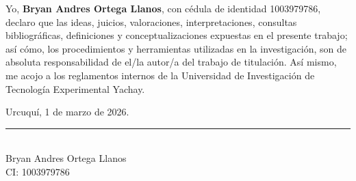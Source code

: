 
Yo, \textbf{Bryan Andres Ortega Llanos}, con cédula de identidad 1003979786, declaro que las ideas, juicios, valoraciones, interpretaciones, consultas bibliográficas, definiciones y conceptualizaciones expuestas en el presente trabajo; así cómo, los procedimientos y herramientas utilizadas en la investigación, son de absoluta responsabilidad de el/la autor/a del trabajo de titulación. Así mismo, me acojo a los reglamentos internos de la Universidad de Investigación de Tecnología Experimental Yachay.

\vspace{0.6cm}

\noindent Urcuquí, 1 de marzo de 2026.

\vspace{2.5cm}

\begin{center}
    \rule[0mm]{60mm}{0.1mm} \\
    {Bryan Andres Ortega Llanos}\\
    CI: 1003979786
\end{center}

\thispagestyle{empty} %
